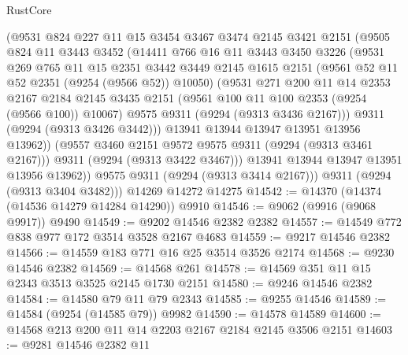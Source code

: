 \begin{lexlean}{RustCore}
\begin{coremodule}
            (@9531
              @824
              @227
              @11
              @15
              @3454
              @3467
              @3474
              @2145
              @3421
              @2151
              (@9505
                @824
                @11
                @3443
                @3452
                (@14411
                  @766
                  @16
                  @11
                  @3443
                  @3450
                  @3226
                  (@9531
                    @269
                    @765
                    @11
                    @15
                    @2351
                    @3442
                    @3449
                    @2145
                    @1615
                    @2151
                    (@9561 @52 @11 @52 @2351 (@9254 (@9566 @52)) @10050)
                    (@9531
                      @271
                      @200
                      @11
                      @14
                      @2353
                      @2167
                      @2184
                      @2145
                      @3435
                      @2151
                      (@9561 @100 @11 @100 @2353 (@9254 (@9566 @100)) @10067)
                      @9575
                      @9311
                      (@9294 (@9313 @3436 @2167)))
                    @9311
                    (@9294 (@9313 @3426 @3442)))
                  @13941
                  @13944
                  @13947
                  @13951
                  @13956
                  @13962))
              (@9557 @3460 @2151 @9572 @9575 @9311 (@9294 (@9313 @3461 @2167)))
              @9311
              (@9294 (@9313 @3422 @3467)))
            @13941
            @13944
            @13947
            @13951
            @13956
            @13962))
        @9575
        @9311
        (@9294 (@9313 @3414 @2167)))
      @9311
      (@9294 (@9313 @3404 @3482)))
    @14269
    @14272
    @14275
@14542 := @14370 (@14374 (@14536 @14279 @14284 @14290)) @9910
@14546 := @9062 (@9916 (@9068 @9917)) @9490
@14549 := @9202 @14546 @2382 @2382
@14557 := @14549 @772 @838 @977 @172 @3514 @3528 @2167 @4683
@14559 := @9217 @14546 @2382
@14566 := @14559 @183 @771 @16 @25 @3514 @3526 @2174
@14568 := @9230 @14546 @2382
@14569 := @14568 @261
@14578 := @14569 @351 @11 @15 @2343 @3513 @3525 @2145 @1730 @2151
@14580 := @9246 @14546 @2382
@14584 := @14580 @79 @11 @79 @2343
@14585 := @9255 @14546
@14589 := @14584 (@9254 (@14585 @79)) @9982
@14590 := @14578 @14589
@14600 := @14568 @213 @200 @11 @14 @2203 @2167 @2184 @2145 @3506 @2151
@14603 := @9281 @14546 @2382 @11

\end{coremodule}
\end{lexlean}
